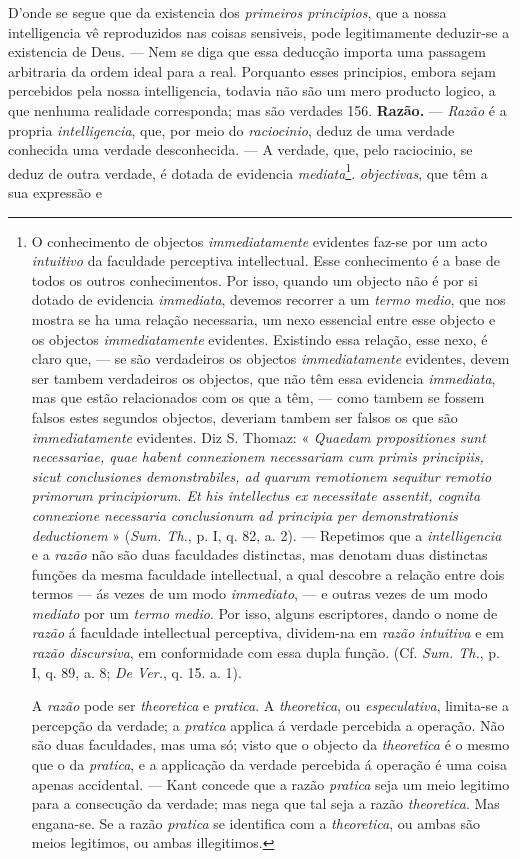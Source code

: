 D'onde se segue que da existencia dos \emph{primeiros principios}, que a nossa intelligencia vê reproduzidos nas coisas sensiveis, pode legitimamente deduzir-se a existencia de Deus. --- Nem se diga que essa deducção importa uma passagem arbitraria da ordem ideal para a real. Porquanto esses principios, embora sejam percebidos pela nossa intelligencia, todavia não são um mero producto logico, a que nenhuma realidade corresponda; mas são verdades  156. \textbf{Razão.} --- \emph{Razão} é a propria \emph{intelligencia}, que, por meio do \emph{raciocinio}, deduz de uma verdade conhecida uma verdade desconhecida. --- A verdade, que, pelo raciocinio, se deduz de outra verdade, é dotada de evidencia \emph{mediata}\footnote{O conhecimento de objectos \emph{immediatamente} evidentes faz-se por um acto \emph{intuitivo} da faculdade perceptiva intellectual. Esse conhecimento é a base de todos os outros conhecimentos. Por isso, quando um objecto não é por si dotado de evidencia \emph{immediata}, devemos recorrer a um \emph{termo medio}, que nos mostra se ha uma relação necessaria, um nexo essencial entre esse objecto e os objectos \emph{immediatamente} evidentes. Existindo essa relação, esse nexo, é claro que, --- se são verdadeiros os objectos \emph{immediatamente} evidentes, devem ser tambem verdadeiros os objectos, que não têm essa evidencia \emph{immediata}, mas que estão relacionados com os que a têm, --- como tambem se fossem falsos estes segundos objectos, deveriam tambem ser falsos os que são \emph{immediatamente} evidentes. Diz S. Thomaz: « \emph{Quaedam propositiones sunt necessariae, quae habent connexionem necessariam cum primis principiis, sicut conclusiones demonstrabiles, ad quarum remotionem sequitur remotio primorum principiorum. Et his intellectus ex necessitate assentit, cognita connexione necessaria conclusionum ad principia per demonstrationis deductionem} » (\emph{Sum. Th.}, p. I, q. 82, a. 2). --- Repetimos que a \emph{intelligencia} e a \emph{razão} não são duas faculdades distinctas, mas denotam duas distinctas funções da mesma faculdade intellectual, a qual descobre a relação entre dois termos --- ás vezes de um modo \emph{immediato}, --- e outras vezes de um modo \emph{mediato} por um \emph{termo medio}. Por isso, alguns escriptores, dando o nome de \emph{razão} á faculdade intellectual perceptiva, dividem-na em \emph{razão intuitiva} e em \emph{razão discursiva}, em conformidade com essa dupla função. (Cf. \emph{Sum. Th.}, p. I, q. 89, a. 8; \emph{De Ver.}, q. 15. a. 1).\par A \emph{razão} pode ser \emph{theoretica} e \emph{pratica}. A \emph{theoretica}, ou \emph{especulativa}, limita-se a percepção da verdade; a \emph{pratica} applica á verdade percebida a operação. Não são duas faculdades, mas uma só; visto que o objecto da \emph{theoretica} é o mesmo que o da \emph{pratica}, e a applicação da verdade percebida á operação é uma coisa apenas accidental. --- Kant concede que a razão \emph{pratica} seja um meio legitimo para a consecução da verdade; mas nega que tal seja a razão \emph{theoretica}. Mas engana-se. Se a razão \emph{pratica} se identifica com a \emph{theoretica}, ou ambas são meios legitimos, ou ambas illegitimos.}. \emph{objectivas}, que têm a sua expressão e 